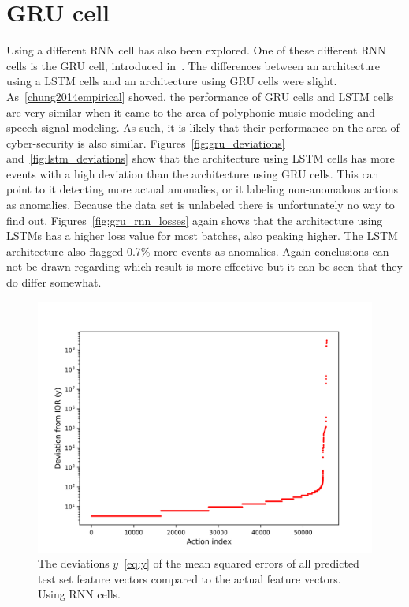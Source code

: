 \section{GRU cell}
Using a different RNN cell has also been explored. One of these different RNN cells is the GRU cell, introduced in~\cite{cho2014learning}. The differences between an architecture using a LSTM cells and an architecture using GRU cells were slight. As~\ref{chung2014empirical} showed, the performance of GRU cells and LSTM cells are very similar when it came to the area of polyphonic music modeling and speech signal modeling. As such, it is likely that their performance on the area of cyber-security is also similar. Figures~\ref{fig:gru_deviations} and~\ref{fig:lstm_deviations} show that the architecture using LSTM cells has more events with a high deviation than the architecture using GRU cells. This can point to it detecting more actual anomalies, or it labeling non-anomalous actions as anomalies. Because the data set is unlabeled there is unfortunately no way to find out. Figures~\ref{fig:gru_rnn_losses} again shows that the architecture using LSTMs has a higher loss value for most batches, also peaking higher. The LSTM architecture also flagged 0.7\% more events as anomalies. Again conclusions can not be drawn regarding which result is more effective but it can be seen that they do differ somewhat.

\begin{figure}
	\begin{center}
		\includegraphics[scale=0.1]{experiments/cell/deviations/rnn}
	\end{center}
	\caption{The deviations \(y\)~\ref{eq:y} of the mean squared errors of all predicted test set feature vectors compared to the actual feature vectors. Using RNN cells.~\label{fig:rnn_deviations}}
\end{figure}

